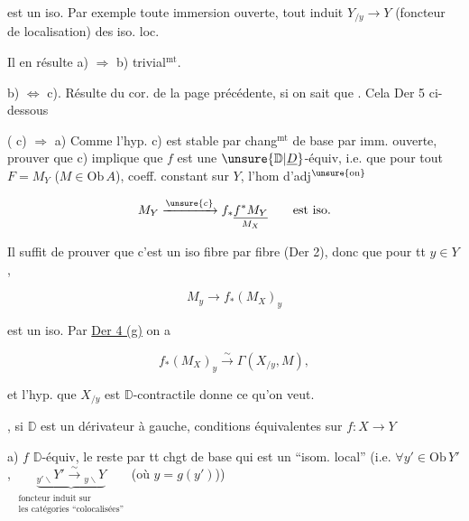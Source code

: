 est un iso. Par exemple toute immersion ouverte, tout   induit $Y_{/y}\longrightarrow Y$ (foncteur de localisation)  des iso. loc.

Il en résulte a) $\Rightarrow$ b) trivial$^{\mathrm{mt}}$.

b) $\Leftrightarrow$ c). Résulte du cor. de la page précédente, si on sait que . Cela   Der 5 ci-dessous



( c) $\Longrightarrow$ a)  Comme l'hyp. c) est stable par chang$^{\mathrm{mt}}$ de base par imm. ouverte,   prouver que c) implique que $f$ est une $\unsure{\mathbb D|\underline D}$-équiv, i.e. que pour tout  $F=M_Y$ ($M\in\mathrm{Ob}\,A$), coeff. constant sur $Y$, l'hom d'adj$^{\unsure{\mathrm{on}}}$

\[ M_Y\xrightarrow{\unsure{c}}f_*\underset{M_X}{\underline{f^*M_Y}}\qquad\text{est iso.} \]

Il suffit de  prouver que c'est un iso fibre par fibre (Der 2), donc que pour tt $y\in Y$,

\[ M_y\longrightarrow f_*(M_X)_y \]

est un iso. Par \uline{Der 4 (g)} on a

\[ f_*(M_X)_y\xrightarrow{\sim}\Gamma(X_{/y},M), \]

et l'hyp. que  $X_{/y}$ est $\mathbb D$-contractile donne ce qu'on veut.


\uline{}, si $\mathbb D$ est un dérivateur à gauche, conditions équivalentes sur $f:X\longrightarrow Y$

a) $f$ $\mathbb D$-équiv, le reste par tt chgt de base  qui est un  ``isom. local'' (i.e. $\forall y'\in\mathrm{Ob}\,Y'$, $\underbrace{{}_{y'\backslash}Y'\xrightarrow{\sim}{}_{y\backslash}Y}_{\substack{\text{foncteur induit sur}\\\text{les catégories ``colocalisées''}}}$ (où $y=g(y')$))

